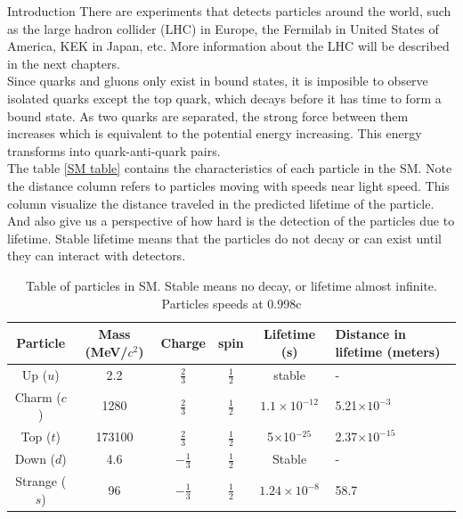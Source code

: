 \begin{chapter}{Introduction}
There are experiments that detects particles around the world, such as the large hadron collider (LHC) in Europe, the Fermilab  in United States of America, KEK in Japan, etc. More information about the LHC will be described in the next chapters.
\\
Since quarks and gluons only exist in bound states, it is imposible to observe isolated quarks except the top quark, which decays before it has time to form a
bound state. As two quarks are separated, the strong force between them increases
which is equivalent to the potential energy increasing. This energy transforms into
quark-anti-quark pairs. \\

The table \ref{SM table} contains the characteristics of each particle in the SM. Note the distance column refers to particles moving with speeds near light speed. This column visualize the distance traveled in the predicted lifetime of the particle. And also give us a perspective of how hard is the detection of the particles due to lifetime. Stable lifetime means that the particles do not decay or can exist until they can interact with detectors. \\

\begin{table}[!htbp]
\caption{Table of particles in SM\cite{pd}. Stable means no decay, or lifetime almost infinite. Particles speeds at 0.998c}
\renewcommand{\arraystretch}{1.5}
\begin{tabular}{|c|c|c|c|c|p{2.5cm}|}
\hline 
Particle	& Mass (MeV/$c^2$)  &Charge  & spin &Lifetime (s)  & Distance in lifetime (meters) \\ 
	\hline 
Up ($u$)	& 2.2 & $\frac{2}{3}$ & $\frac{1}{2}$ & stable &  -\\ 
	\hline 
Charm ($c$)	& 1280 &$\frac{2}{3}$  &  $\frac{1}{2}$ & $ 1.1 \times 10^{-12}$ &  5.21$\times 10^{-3}$ \\ 
	\hline 
Top	($t$)& 173100 & $\frac{2}{3}$ & $\frac{1}{2}$  & 5$\times$10$^{-25}$ &2.37$\times 10^{-15}$   \\ 
	\hline 
Down ($d$)	& 4.6 &$-\frac{1}{3}$  & $\frac{1}{2}$  & Stable & - \\ 
	\hline 
Strange ($s$)	& 96 &$-\frac{1}{3}$  & $\frac{1}{2}$  &$1.24 \times 10^{-8}$  & 58.7 \\ 
	\hline 


\end{tabular}
\end{table}
\end{chapter}
